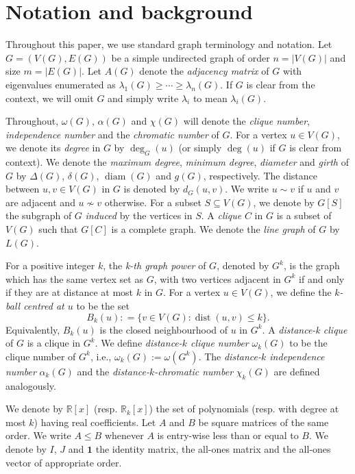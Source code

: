 \documentclass[11pt]{article}
\theoremstyle{plain}
\numberwithin{equation}{section}
\DeclareMathOperator{\diam}{diam}
\DeclareMathOperator{\dist}{dist}
\begin{document}
\section{Notation and background}
Throughout this paper, we use standard graph terminology and notation. Let $G=(V(G), E(G))$ be a simple undirected graph of order $n = |V(G)|$ and size $m = |E(G)|$. Let $A(G)$ denote the \emph{adjacency matrix} of $G$ with eigenvalues enumerated as $\lambda_{1}(G)\geq \cdots \geq \lambda_{n}(G)$. If $G$ is clear from the context, we will omit $G$ and simply write $\lambda_i$ to mean $\lambda_i(G)$. 

Throughout, $\omega(G)$, $\alpha(G)$ and $\chi(G)$ will denote the \emph{clique number}, \emph{independence number} and the \emph{chromatic number} of $G$. For a vertex $u\in V(G)$, we denote its \emph{degree} in $G$ by $\deg_G(u)$ (or simply $\deg(u)$ if $G$ is clear from context). We denote the \emph{maximum degree}, \emph{minimum degree}, \emph{diameter} and \emph{girth} of $G$ by $\Delta(G)$, $\delta(G)$, $\diam(G)$ and $g(G)$, respectively. The distance between $u,v\in V(G)$ in $G$ is denoted by $d_G(u,v)$. We write $u\sim v$ if $u$ and $v$ are adjacent and $u\nsim v$ otherwise. For a subset $S\subseteq V(G)$, we denote by $G[S]$ the subgraph of $G$ \emph{induced} by the vertices in $S$. A \emph{clique} $C$ in $G$ is a subset of $V(G)$ such that $G[C]$ is a complete graph. We denote the \emph{line graph} of $G$ by $L(G)$. 

For a positive integer $k$, the \emph{k-th graph power} of $G$, denoted by $G^k$, is the graph which has the same vertex set as $G$, with two vertices adjacent in $G^k$ if and only if they are at distance at most $k$ in $G$. For a vertex $u\in V(G)$, we define the \emph{$k$-ball centred at $u$} to be the set \[ B_k(u): = \{v\in V(G): \dist(u,v)\le k\}.\] Equivalently, $B_k(u)$ is the closed neighbourhood of $u$ in $G^k$. A \emph{distance-k clique} of $G$ is a clique in $G^k$. We define \emph{distance-$k$ clique number} $\omega_k(G)$ to be the clique number of $G^k$, i.e., $\omega_k(G):=\omega(G^k)$. The \emph{distance-$k$ independence number} $\alpha_k(G)$ and the \emph{distance-$k$-chromatic number} $\chi_k(G)$ are defined analogously. 

We denote by $\mathbb{R}[x]$ (resp. $\mathbb{R}_k[x]$) the set of polynomials (resp. with degree at most $k$) having real coefficients. Let $A$ and $B$ be square matrices of the same order. We write $A\le B$ whenever $A$ is entry-wise less than or equal to $B$. We denote by $I$, $J$ and $\mathbf{1}$ the identity matrix, the all-ones matrix and the all-ones vector of appropriate order. 
\end{document}
